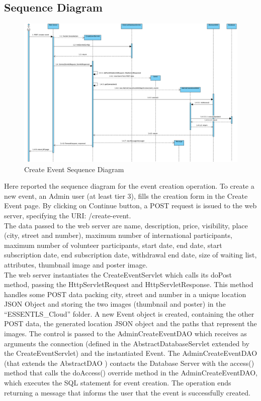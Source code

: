 \subsection{Sequence Diagram}

\begin{figure}[H]
    \centering
    \includegraphics[width=1\textwidth]{images/CreateEventSequence.png}
    \caption{Create Event Sequence Diagram}
    \label{fig:create event sequence diagram}
\end{figure}

Here reported the sequence diagram for the event creation operation.
To create a new event, an Admin user (at least tier 3), fills the creation form in the Create Event page.
By clicking on Continue button, a POST request is issued to the web server, specifying the URI: /create-event. \\
The data passed to the web server are name, description, price, visibility, place (city, street and number),
maximum number of international participants, maximum number of volunteer participants, start date, end date,
start subscription date, end subscription date, withdrawal end date, size of waiting list, attributes,
thumbnail image and poster image. \\
The web server instantiates the CreateEventServlet which calls its doPost method, passing the HttpServletRequest
and HttpServletResponse. This method handles some POST data packing city, street and number in a unique location JSON
Object and storing the two images (thumbnail and poster) in the “ESSENTLS\_Cloud” folder.
A new Event object is created, containing the other POST data, the generated location JSON object and the paths that
represent the images. The control is passed to the AdminCreateEventDAO which receives as arguments the connection
(defined in the AbstractDatabaseServlet extended by the CreateEventServlet) and the instantiated Event.
The AdminCreateEventDAO (that extends the AbstractDAO ) contacts the Database Server with the access() method that
calls the doAccess() override method in the AdminCreateEventDAO, which executes the SQL statement for event creation.
The operation ends returning a message that informs the user that the event is successfully created.